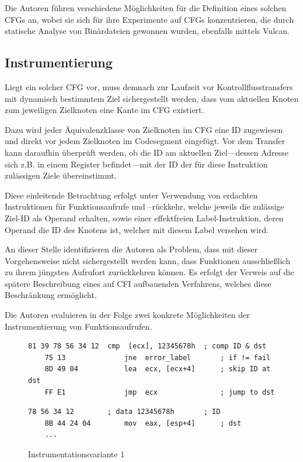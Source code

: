 \documentclass[11pt]{article}
\begin{document}
Die Autoren führen verschiedene Möglichkeiten für die Definition eines solchen
CFGs an, wobei sie sich für ihre Experimente auf CFGs konzentrieren, die durch
statische Analyse von Binärdateien gewonnen wurden, ebenfalls mittels Vulcan.


\subsection{Instrumentierung}

Liegt ein solcher CFG vor, muss demnach zur Laufzeit vor Kontrollflusstransfers
mit dynamisch bestimmtem Ziel sichergestellt werden, dass vom aktuellen Knoten
zum jeweiligen Zielknoten eine Kante im CFG existiert.

Dazu wird jeder Äquivalenzklasse von Zielknoten im CFG eine ID zugewiesen und
direkt vor jedem Zielknoten im Codesegment eingefügt. Vor dem Transfer kann
daraufhin überprüft werden, ob die ID am aktuellen Ziel—dessen Adresse sich
z.B. in einem Register befindet—mit der ID der für diese Instruktion zulässigen
Ziele übereinstimmt.

Diese einleitende Betrachtung erfolgt unter Verwendung von erdachten
Instruktionen für Funktionsaufrufe und –rückkehr, welche jeweils die zulässige
Ziel-ID als Operand erhalten, sowie einer effektfreien Label-Instruktion, deren
Operand die ID des Knotens ist, welcher mit diesem Label versehen wird.

An dieser Stelle identifizieren die Autoren als Problem, dass mit dieser
Vorgehensweise nicht sichergestellt werden kann, dass Funktionen ausschließlich
zu ihrem jüngsten Aufrufort zurückkehren können. Es erfolgt der Verweis auf die
spätere Beschreibung eines auf CFI aufbauenden Verfahrens, welches diese
Beschränkung ermöglicht.

Die Autoren evaluieren in der Folge zwei konkrete Möglichkeiten der
Instrumentierung von Funktionsaufrufen.

\lstset{
  language=[x86masm]Assembler,
  basicstyle=\ttfamily\small,
  frame=lines
}

\begin{figure}
  \begin{lstlisting}[title=Quelle]
    81 39 78 56 34 12  cmp  [ecx], 12345678h  ; comp ID & dst
    75 13              jne  error_label       ; if != fail
    8D 49 04           lea  ecx, [ecx+4]      ; skip ID at dst
    FF E1              jmp  ecx               ; jump to dst
  \end{lstlisting}

  \begin{lstlisting}[title=Ziel]
    78 56 34 12        ; data 12345678h       ; ID
    8B 44 24 04        mov  eax, [esp+4]      ; dst
    ...
  \end{lstlisting}

  \caption{Instrumentationsvariante 1}
  \label{fig:instrumentation-variant1}
\end{figure}
\end{document}
